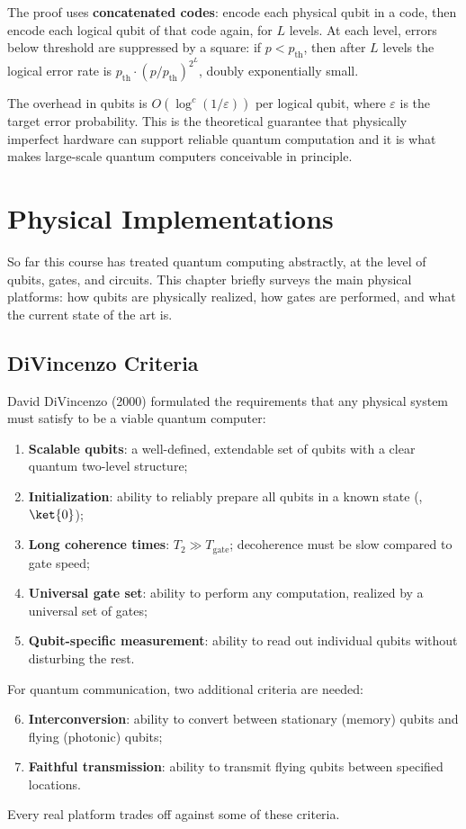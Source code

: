 \documentclass[oneside]{academica}
\begin{document}
The proof uses \textbf{concatenated codes}: encode each physical qubit in a code, then encode each logical qubit of that code again, for $L$ levels.
At each level, errors below threshold are suppressed by a square: if $p<p_{\mathrm{th}}$, then after $L$ levels the logical error rate is $p_{\mathrm{th}}\cdot(p/p_{\mathrm{th}})^{2^L}$, doubly exponentially small.

The overhead in qubits is $O(\log^c(1/\varepsilon))$ per logical qubit, where $\varepsilon$ is the target error probability.
This is the theoretical guarantee that physically imperfect hardware can support reliable quantum computation and it is what makes large-scale quantum computers conceivable in principle.

\chapter{Physical Implementations}

So far this course has treated quantum computing abstractly, at the level of qubits, gates, and circuits.
This chapter briefly surveys the main physical platforms: how qubits are physically realized, how gates are performed, and what the current state of the art is.

\section{DiVincenzo Criteria}

David DiVincenzo (2000) formulated the requirements that any physical system must satisfy to be a viable quantum computer:
\begin{enumerate}
  \item \textbf{Scalable qubits}: a well-defined, extendable set of qubits with a clear quantum two-level structure;
  \item \textbf{Initialization}: ability to reliably prepare all qubits in a known state (\eg, $\ket{0}$);
  \item \textbf{Long coherence times}: $T_2\gg T_{\mathrm{gate}}$; decoherence must be slow compared to gate speed;
  \item \textbf{Universal gate set}: ability to perform any computation, realized by a universal set of gates;
  \item \textbf{Qubit-specific measurement}: ability to read out individual qubits without disturbing the rest.
\end{enumerate}
For quantum communication, two additional criteria are needed:
\begin{enumerate}
  \setcounter{enumi}{5}
  \item \textbf{Interconversion}: ability to convert between stationary (memory) qubits and flying (photonic) qubits;
  \item \textbf{Faithful transmission}: ability to transmit flying qubits between specified locations.
\end{enumerate}
Every real platform trades off against some of these criteria.
\end{document}
